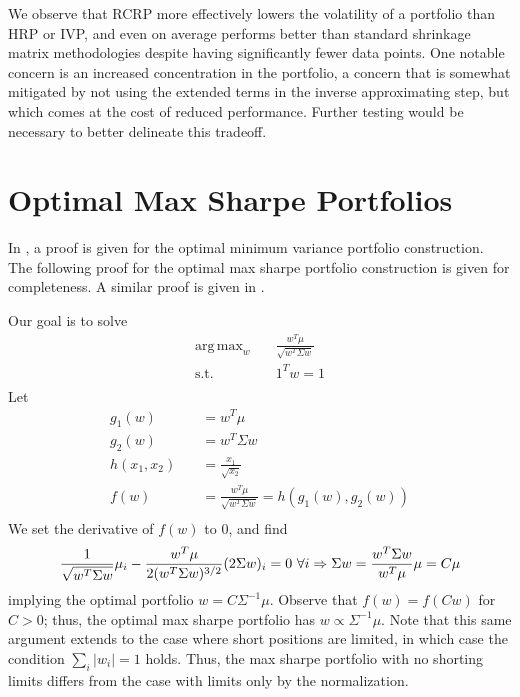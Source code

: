 \documentclass[10pt,twoside,titlepage]{article}   %
\DeclareMathOperator*{\argmax}{arg\,max}
\begin{document}
We observe that RCRP more effectively lowers the volatility of a portfolio than HRP or IVP, 
and even on average performs better than standard shrinkage matrix methodologies despite having significantly fewer data points. 
One notable concern is an increased concentration in the portfolio, 
a concern that is somewhat mitigated by not using the extended terms in the inverse approximating step, 
but which comes at the cost of reduced performance. 
Further testing would be necessary to better delineate this tradeoff.

\appendix
\section{Optimal Max Sharpe Portfolios}\label{sec-Appendix1}
In \cite{HRP}, a proof is given for the optimal minimum variance portfolio construction. 
The following proof for the optimal max sharpe portfolio construction is given for completeness. 
A similar proof is given in \cite{StackExchange}.

Our goal is to solve
\begin{equation*}
\begin{aligned}
\argmax_{w} \quad & \frac{w^T \mu}{ \sqrt{ w^T \Sigma w } } \\
\textrm{s.t.} \quad & 1^T w = 1\\
\end{aligned}
\end{equation*}
Let
\begin{equation*}
\begin{aligned}
g_1( w ) \quad & = w^T \mu \\
g_2( w ) \quad & = w^T \Sigma w \\
h( x_1 , x_2 ) \quad & = \frac{x_1}{ \sqrt{ x_2 } } \\
f( w ) \quad & = \frac{ w^T\mu}{ \sqrt{ w^T \Sigma w } } = h( g_1(w),g_2(w)) \\
\end{aligned}
\end{equation*}
We set the derivative of $f(w)$ to $0$, and find
\begin{equation*}
\frac{1}{\sqrt{w^T \Sigma w}} \mu_i - \frac{ w^T \mu }{ 2(w^T \Sigma w)^{3/2} } ( 2\Sigma w)_i = 0 \textrm{ } \forall i \Rightarrow \Sigma w = \frac{ w^T \Sigma w }{ w^T \mu } \mu = C \mu \\
\end{equation*}
implying the optimal portfolio $w = C\Sigma^{-1}\mu$. 
Observe that $f(w)=f(Cw)$ for $C>0$; thus, the optimal max sharpe portfolio has $w \propto \Sigma^{-1}\mu$. 
Note that this same argument extends to the case where short positions are limited, 
in which case the condition $\sum_i |w_i| = 1$ holds. 
Thus, the max sharpe portfolio with no shorting limits differs from the case with limits only by the normalization.
\end{document}

